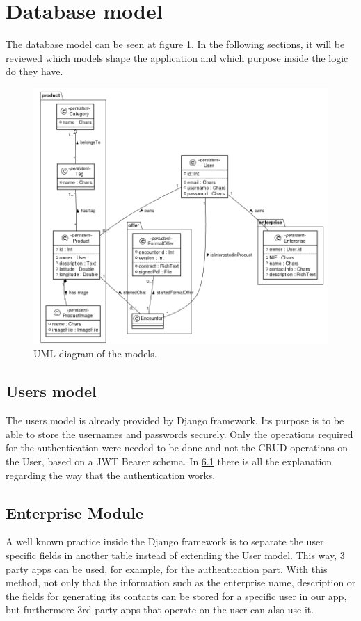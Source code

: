 \documentclass[./main.tex]{subfiles}
\begin{document}
\section{Database model}
The database model can be seen at figure \ref{fig:model-uml}. In the following
sections, it will be reviewed which models shape the application and
which purpose inside the logic do they have.

\begin{figure}[H]
\centering
\includegraphics[width=\linewidth]{img/database-model.png}
\caption{UML diagram of the models.}
\label{fig:model-uml}
\end{figure}


\subsection{Users model}
The users model is already provided by Django framework. Its purpose is
to be able to store the usernames and passwords securely. Only
the operations required for the authentication were needed to be done
and not the CRUD operations on the User, based on a JWT Bearer schema.
In \protect\hyperlink{org712facd}{6.1} there is all the explanation
regarding the way that the authentication works.


\subsection{Enterprise Module}
A well known practice inside the Django framework is to separate the
user specific fields in another table instead of extending the User
model. This way, 3 party apps can be used, for example, for the
authentication part. With this method, not only that the information
such as the enterprise name, description or the fields for generating
its contacts can be stored for a specific user in our app, but
furthermore 3rd party apps that operate on the user can also use it.
\end{document}
